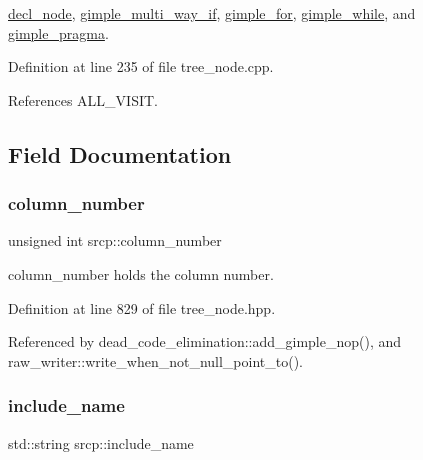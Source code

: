 \hyperlink{structdecl__node_a9e63331f0c35d9af9d1997afafe9152a}{decl\+\_\+node}, \hyperlink{structgimple__multi__way__if_a5f89fbe2e85d7d49eb8684204e309712}{gimple\+\_\+multi\+\_\+way\+\_\+if}, \hyperlink{structgimple__for_a582c8e3f0d70da9d0c1e8365eb56836d}{gimple\+\_\+for}, \hyperlink{structgimple__while_a8fbe7b677d626e16026d600db417ef32}{gimple\+\_\+while}, and \hyperlink{structgimple__pragma_ac7dac0c665ea703c9d8f0891016ef972}{gimple\+\_\+pragma}.



Definition at line 235 of file tree\+\_\+node.\+cpp.



References A\+L\+L\+\_\+\+V\+I\+S\+IT.



\subsection{Field Documentation}
\mbox{\label{structsrcp_a680f312ce457070fe3d698662d34e543}} 
\subsubsection{\texorpdfstring{column\+\_\+number}{column\_number}}
{\footnotesize\ttfamily unsigned int srcp\+::column\+\_\+number}



column\+\_\+number holds the column number. 



Definition at line 829 of file tree\+\_\+node.\+hpp.



Referenced by dead\+\_\+code\+\_\+elimination\+::add\+\_\+gimple\+\_\+nop(), and raw\+\_\+writer\+::write\+\_\+when\+\_\+not\+\_\+null\+\_\+point\+\_\+to().

\mbox{\label{structsrcp_aa9b1c535be5bf6dfd5934a8a1aa7ddab}} 
\subsubsection{\texorpdfstring{include\+\_\+name}{include\_name}}
{\footnotesize\ttfamily std\+::string srcp\+::include\+\_\+name}



